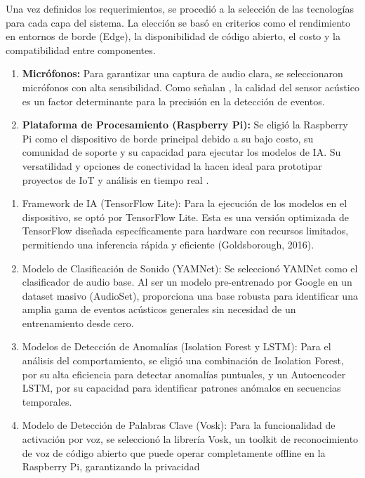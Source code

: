 
Una vez definidos los requerimientos, se procedió a la selección de las tecnologías para cada capa del sistema. La elección se basó en criterios como el rendimiento en entornos de borde (Edge), la disponibilidad de código abierto, el costo y la compatibilidad entre componentes.


\begin{enumerate}
      \item \textbf{Micrófonos:} Para garantizar una captura de audio clara, se seleccionaron micrófonos con alta sensibilidad. Como señalan \citeauthor{torija_metodologia_2018} \citeyear{torija_metodologia_2018}, la calidad del sensor acústico es un factor determinante para la precisión en la detección de eventos.
      \item \textbf{Plataforma de Procesamiento (Raspberry Pi):} Se eligió la Raspberry Pi como el dispositivo de borde principal debido a su bajo costo, su comunidad de soporte y su capacidad para ejecutar los modelos de IA. Su versatilidad y opciones de conectividad la hacen ideal para prototipar proyectos de IoT y análisis en tiempo real \cite{richardson_getting_2016}.
\end{enumerate}


\begin{enumerate}
      \item Framework de IA (TensorFlow Lite): Para la ejecución de los modelos en el dispositivo, se optó por TensorFlow Lite. Esta es una versión optimizada de TensorFlow diseñada específicamente para hardware con recursos limitados, permitiendo una inferencia rápida y eficiente (Goldsborough, 2016).
      \item Modelo de Clasificación de Sonido (YAMNet): Se seleccionó YAMNet como el clasificador de audio base. Al ser un modelo pre-entrenado por Google en un dataset masivo (AudioSet), proporciona una base robusta para identificar una amplia gama de eventos acústicos generales sin necesidad de un entrenamiento desde cero.
      \item Modelos de Detección de Anomalías (Isolation Forest y LSTM): Para el análisis del comportamiento, se eligió una combinación de Isolation Forest, por su alta eficiencia para detectar anomalías puntuales, y un Autoencoder LSTM, por su capacidad para identificar patrones anómalos en secuencias temporales.
      \item Modelo de Detección de Palabras Clave (Vosk): Para la funcionalidad de activación por voz, se seleccionó la librería Vosk, un toolkit de reconocimiento de voz de código abierto que puede operar completamente offline en la Raspberry Pi, garantizando la privacidad
\end{enumerate}

